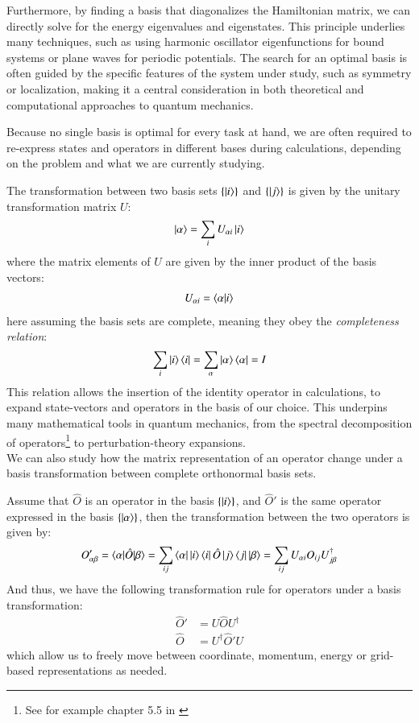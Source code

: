 \documentclass{subfiles}
\begin{document}
Furthermore, by finding a basis that diagonalizes the Hamiltonian matrix, we can directly solve for the energy eigenvalues and eigenstates. This principle underlies many techniques, such as using harmonic oscillator eigenfunctions for bound systems or plane waves for periodic potentials\cite{griffiths2018introduction, kittel2018introduction}. The search for an optimal basis is often guided by the specific features of the system under study, such as symmetry or localization, making it a central consideration in both theoretical and computational approaches to quantum mechanics. 

Because no single basis is optimal for every task at hand, we are often required to re-express states and operators in different bases during calculations, depending on the problem and what we are currently studying. 

The transformation between two basis sets $\{\ket{i}\}$ and $\{\ket{j}\}$ is given by the unitary transformation matrix $U$:
\begin{align*}
    \ket{\alpha} = \sum_i U_{\alpha i}\ket{i}
\end{align*}
where the matrix elements of $U$ are given by the inner product of the basis vectors:
\begin{align*}
    U_{\alpha i} = \braket{\alpha|i}
\end{align*}
here assuming the basis sets are complete, meaning they obey the \emph{completeness relation}:
\begin{align*}
    \sum_i \ket{i}\bra{i} = \sum_\alpha \ket{\alpha}\bra{\alpha} = I
\end{align*}
This relation allows the insertion of the identity operator in calculations, to expand state-vectors and operators in the basis of our choice. This underpins many mathematical tools in quantum mechanics, from the spectral decomposition of operators\footnote{See for example chapter 5.5 in \cite{strang2000linear}} to perturbation-theory expansions\cite{griffiths2018introduction, berera2021quantum, sakurai1986modern}. \\


We can also study how the matrix representation of an operator change under a basis transformation between complete orthonormal basis sets.\cite{szabo1996modern}

Assume that $\hat O$ is an operator in the basis $\{\ket{i}\}$, and $\hat O'$ is the same operator expressed in the basis $\{\ket{\alpha}\}$, then the transformation between the two operators is given by:
\begin{align*}
    O'_{\alpha\beta} = \braket{\alpha|\hat O|\beta} = \sum_{ij}\bra{\alpha}\ket{i}\bra{i}\hat O\ket{j}\bra{j}\ket{\beta} = \sum_{ij}U_{\alpha i}O_{ij}U^\dagger_{j\beta}
\end{align*}
And thus, we have the following transformation rule for operators under a basis transformation:
\begin{align*}
    \hat O' &= U\hat OU^\dagger \\
    \hat O &= U^\dagger\hat O'U
\end{align*}
which allow us to freely move between coordinate, momentum, energy or grid-based representations as needed.
\end{document}
